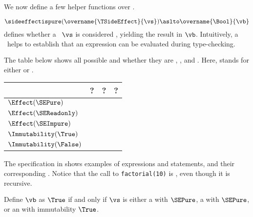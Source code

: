We now define a few helper functions over \sideeffectdescriptorsterm.

\hypertarget{def-sideeffectispure}{}
\[
    \sideeffectispure(\overname{\TSideEffect}{\vs}) \aslto \overname{\Bool}{\vb}
\]
defines whether a \sideeffectdescriptorterm\ $\vs$ is considered \emph{\pureterm},
yielding the result in $\vb$.
Intuitively, a \emph{\pureterm} \sideeffectdescriptorterm\ helps to establish that
an expression can be evaluated during type-checking.

The table below shows all possible \sideeffectdescriptorsterm{} and whether they are \pureterm{}, \readonlyterm{}, and \symbolicallyevaluableterm{}.
Here, \Effect{} stands for either \LocalEffect{} or \GlobalEffect{}.

\begin{center}
\begin{tabular}{llll}
\textbf{\sideeffectdescriptorterm{}} & \textbf{\pureterm{}?} & \textbf{\readonlyterm{}?} & \textbf{\symbolicallyevaluableterm{}?}\\
\hline
$\Effect(\SEPure)$      & \True{}  & \True{}  & \True{}  \\
$\Effect(\SEReadonly)$  & \False{} & \True{}  & \True{}  \\
$\Effect(\SEImpure)$    & \False{} & \False{} & \False{} \\
$\Immutability(\True)$  & \True{}  & \True{}  & \True{}  \\
$\Immutability(\False)$ & \False{} & \True{}  & \False{} \\
\end{tabular}
\end{center}

The specification in  shows examples of expressions
and statements, and their corresponding \sideeffectdescriptorsterm{}.
Notice that the call to \verb|factorial(10)| is \readonlyterm, even though it is recursive.


\ProseParagraph
Define $\vb$ as $\True$ if and only if $\vs$ is either
    a \LocalEffectTerm{} with \purity{} $\SEPure$,
    a \GlobalEffectTerm{} with \purity{} $\SEPure$,
    or an \ImmutabilityTerm{} with immutability $\True$.


